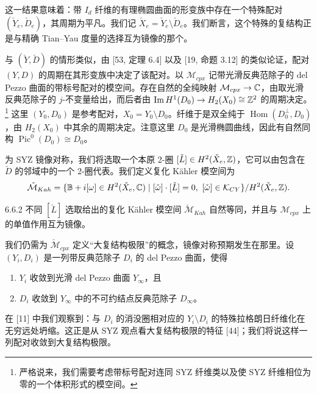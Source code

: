 这一结果意味着：带 $I_d$ 纤维的有理椭圆曲面的形变族中存在一个特殊配对 $(\check Y_e,\check D_e)$，其周期为平凡。我们记 $\check X_e=\check Y_e\setminus\check D_e$。我们断言，这个特殊的复结构正是与精确 Tian--Yau 度量的选择互为镜像的那个。

与 $(\check Y,\check D)$ 的情形类似，由 [53, 定理 6.4] 以及 [19, 命题 3.12] 的类似论证，配对 $(Y,D)$ 的周期在其形变族中决定了该配对。以 $\mathcal{M}_{cpx}$ 记带光滑反典范除子的 del Pezzo 曲面的带标号配对的模空间。存在自然的全纯映射 $\mathcal{M}_{cpx}\to\mathbb{C}$，由取光滑反典范除子的 $j$-不变量给出，而后者由 $\operatorname{Im}H^1(D_0)\to H_2(X_0)\cong\mathbb{Z}^2$ 的周期决定。\footnote{严格说来，我们需要考虑带标号配对连同 SYZ 纤维类以及使 SYZ 纤维相位为零的一个体积形式的模空间。}
这里 $(Y_0,D_0)$ 是参考配对，$X_0=Y_0\setminus D_0$。纤维于是双全纯于 $\operatorname{Hom}(D_0^{\perp},D_0)$，由 $H_2(X_0)$ 中其余的周期决定。注意这里 $D_0$ 是光滑椭圆曲线，因此有自然同构 $\operatorname{Pic}^0(D_0)\cong D_0$。

为 SYZ 镜像对称，我们将选取一个本原 2-圈 $[\check L]\in H^2(\check X_e,\mathbb{Z})$，它可以由包含在 $\check D$ 的邻域中的一个 2-圈代表。我们定义复化 Kähler 模空间为
\[
\check{\mathcal{M}}_{Kah}=\{\mathbb{B}+i[\omega]\in H^2(\check X_e,\C)\mid[\check\omega]\cdot[\check L]=0,\ [\check\omega]\in\mathcal{K}_{CY}\}/H^2(\check X_e,\Z).
\]

\begin{remark}{6.6.2}
不同 $[\check L]$ 选取给出的复化 Kähler 模空间 $\check{\mathcal{M}}_{Kah}$ 自然等同，并且与 $\mathcal{M}_{cpx}$ 上的单值作用互为镜像。
\end{remark}

我们仍需为 $\check{\mathcal{M}}_{cpx}$ 定义“大复结构极限”的概念，镜像对称预期发生在那里。设 $(Y_i,D_i)$ 是一列带反典范除子 $D_i$ 的 del Pezzo 曲面，使得
\begin{enumerate}
\item $Y_i$ 收敛到光滑 del Pezzo 曲面 $Y_\infty$，且
\item $D_i$ 收敛到 $Y_\infty$ 中的不可约结点反典范除子 $D_\infty$。
\end{enumerate}
在 [11] 中我们观察到：与 $D_i$ 的消没圈相对应的 $Y_i\setminus D_i$ 的特殊拉格朗日纤维化在无穷远处坍缩。这正是从 SYZ 观点看大复结构极限的特征 [44]；我们将说这样一列配对收敛到大复结构极限。

